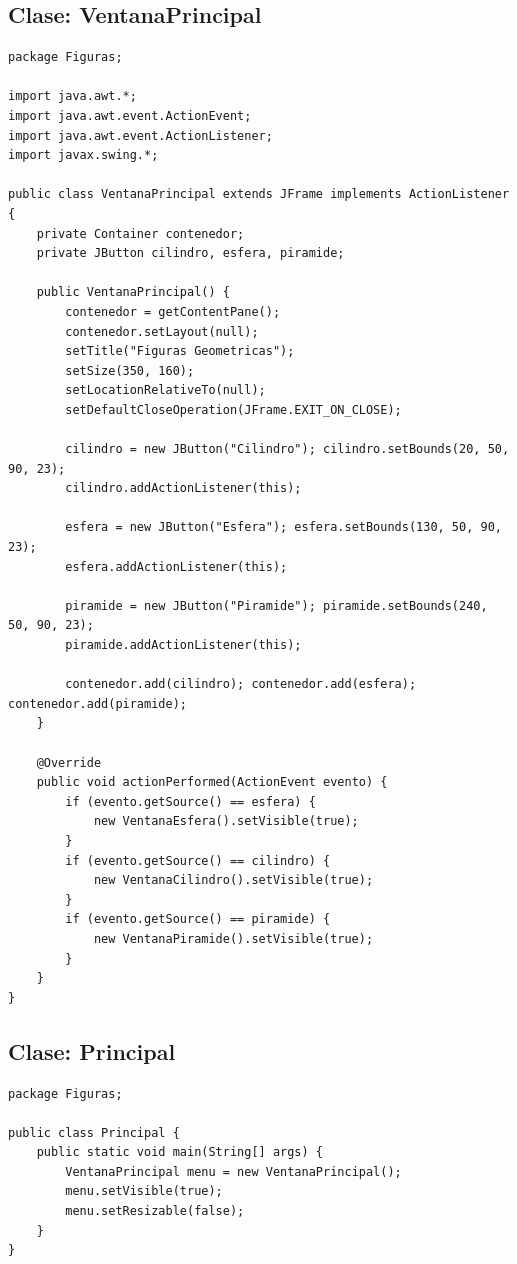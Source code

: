 \documentclass[12pt,a4paper]{article}
\begin{document}
\subsection*{Clase: VentanaPrincipal}
\begin{lstlisting}[caption={Clase VentanaPrincipal.java}]
package Figuras;

import java.awt.*;
import java.awt.event.ActionEvent;
import java.awt.event.ActionListener;
import javax.swing.*;

public class VentanaPrincipal extends JFrame implements ActionListener {
    private Container contenedor;
    private JButton cilindro, esfera, piramide;

    public VentanaPrincipal() {
        contenedor = getContentPane();
        contenedor.setLayout(null);
        setTitle("Figuras Geometricas");
        setSize(350, 160);
        setLocationRelativeTo(null);
        setDefaultCloseOperation(JFrame.EXIT_ON_CLOSE);

        cilindro = new JButton("Cilindro"); cilindro.setBounds(20, 50, 90, 23);
        cilindro.addActionListener(this);

        esfera = new JButton("Esfera"); esfera.setBounds(130, 50, 90, 23);
        esfera.addActionListener(this);

        piramide = new JButton("Piramide"); piramide.setBounds(240, 50, 90, 23);
        piramide.addActionListener(this);

        contenedor.add(cilindro); contenedor.add(esfera); contenedor.add(piramide);
    }

    @Override
    public void actionPerformed(ActionEvent evento) {
        if (evento.getSource() == esfera) {
            new VentanaEsfera().setVisible(true);
        }
        if (evento.getSource() == cilindro) {
            new VentanaCilindro().setVisible(true);
        }
        if (evento.getSource() == piramide) {
            new VentanaPiramide().setVisible(true);
        }
    }
}
\end{lstlisting}

\subsection*{Clase: Principal}
\begin{lstlisting}[caption={Clase Principal.java}]
package Figuras;

public class Principal {
    public static void main(String[] args) {
        VentanaPrincipal menu = new VentanaPrincipal();
        menu.setVisible(true);
        menu.setResizable(false);
    }
}
\end{lstlisting}
\end{document}

